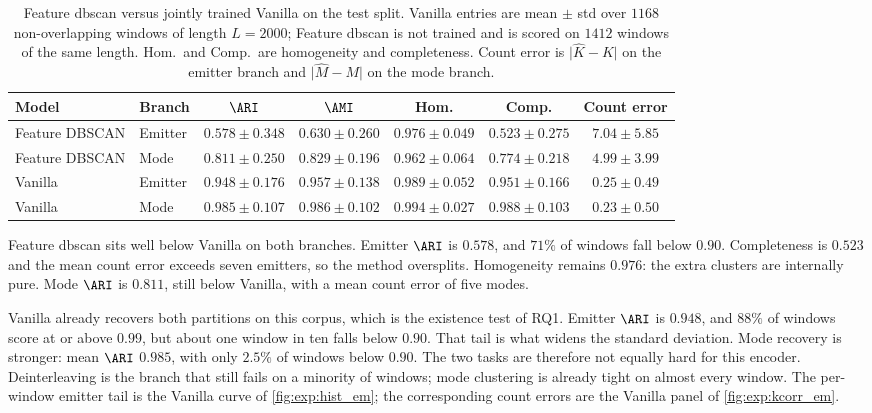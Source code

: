 \begin{table}[tbp]
  \centering
  \small
  \caption{Feature \gls{dbscan} versus jointly trained Vanilla on the test split. Vanilla entries are mean $\pm$ std over $1168$ non-overlapping windows of length $L=2000$; Feature \gls{dbscan} is not trained and is scored on $1412$ windows of the same length. Hom.\ and Comp.\ are homogeneity and completeness. Count error is $\lvert\hat{K}-K\rvert$ on the emitter branch and $\lvert\hat{M}-M\rvert$ on the mode branch.}
  \label{tab:exp:vanilla}
  \begin{tabular}{@{}llccccc@{}}
    \toprule
    Model & Branch & $\ARI$ & $\AMI$ & Hom. & Comp. & Count error \\
    \midrule
    Feature DBSCAN & Emitter & $0.578\pm0.348$ & $0.630\pm0.260$ & $0.976\pm0.049$ & $0.523\pm0.275$ & $7.04\pm5.85$ \\
    Feature DBSCAN & Mode    & $0.811\pm0.250$ & $0.829\pm0.196$ & $0.962\pm0.064$ & $0.774\pm0.218$ & $4.99\pm3.99$ \\
    \midrule
    Vanilla        & Emitter & $0.948\pm0.176$ & $0.957\pm0.138$ & $0.989\pm0.052$ & $0.951\pm0.166$ & $0.25\pm0.49$ \\
    Vanilla        & Mode    & $0.985\pm0.107$ & $0.986\pm0.102$ & $0.994\pm0.027$ & $0.988\pm0.103$ & $0.23\pm0.50$ \\
    \bottomrule
  \end{tabular}
\end{table}

Feature \gls{dbscan} sits well below Vanilla on both branches.
Emitter $\ARI$ is $0.578$, and $71\%$ of windows fall below $0.90$.
Completeness is $0.523$ and the mean count error exceeds seven emitters, so the method oversplits.
Homogeneity remains $0.976$: the extra clusters are internally pure.
Mode $\ARI$ is $0.811$, still below Vanilla, with a mean count error of five modes.

Vanilla already recovers both partitions on this corpus, which is the existence test of RQ1.
Emitter $\ARI$ is $0.948$, and $88\%$ of windows score at or above $0.99$, but about one window in ten falls below $0.90$.
That tail is what widens the standard deviation.
Mode recovery is stronger: mean $\ARI$ $0.985$, with only $2.5\%$ of windows below $0.90$.
The two tasks are therefore not equally hard for this encoder.
Deinterleaving is the branch that still fails on a minority of windows; mode clustering is already tight on almost every window.
The per-window emitter tail is the Vanilla curve of \cref{fig:exp:hist_em}; the corresponding count errors are the Vanilla panel of \cref{fig:exp:kcorr_em}.
